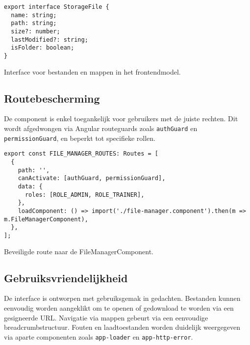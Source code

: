 \begin{listing}[H]
\begin{verbatim}
export interface StorageFile {
  name: string;
  path: string;
  size?: number;
  lastModified?: string;
  isFolder: boolean;
}
\end{verbatim}
\caption[Bestandstype in de frontend]{Interface voor bestanden en mappen in het frontendmodel.}
\end{listing}

\subsection{Routebescherming}

De component is enkel toegankelijk voor gebruikers met de juiste rechten. Dit wordt afgedwongen via Angular routeguards zoals \texttt{authGuard} en \texttt{permissionGuard}, en beperkt tot specifieke rollen.

\begin{listing}[H]
\begin{verbatim}
export const FILE_MANAGER_ROUTES: Routes = [
  {
    path: '',
    canActivate: [authGuard, permissionGuard],
    data: {
      roles: [ROLE_ADMIN, ROLE_TRAINER],
    },
    loadComponent: () => import('./file-manager.component').then(m => m.FileManagerComponent),
  },
];
\end{verbatim}
\caption[Routeconfiguratie]{Beveiligde route naar de FileManagerComponent.}
\end{listing}

\subsection{Gebruiksvriendelijkheid}

De interface is ontworpen met gebruiksgemak in gedachten. Bestanden kunnen eenvoudig worden aangeklikt om te openen of gedownload te worden via een gesigneerde URL. Navigatie via mappen gebeurt via een eenvoudige breadcrumbstructuur. Fouten en laadtoestanden worden duidelijk weergegeven via aparte componenten zoals \texttt{app-loader} en \texttt{app-http-error}.
